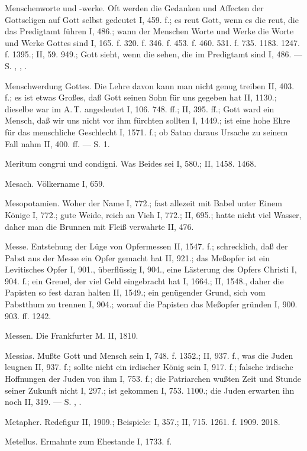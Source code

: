 Menschenworte und -werke. Oft werden die Gedanken und Affecten der Gottseligen auf Gott selbst gedeutet I, 459. f.; es reut Gott, wenn es die reut, die das Predigtamt führen I, 486.; wann der Menschen Worte und Werke die Worte und Werke Gottes sind I, 165. f. 320. f. 346. f. 453. f. 460. 531. f. 735. 1183. 1247. f. 1395.; II, 59. 949.; Gott sieht, wenn die sehen, die im Predigtamt sind I, 486. — S. , , .

Menschwerdung Gottes. Die Lehre davon kann man nicht genug treiben II, 403. f.; es ist etwas Großes, daß Gott seinen Sohn für uns gegeben hat II, 1130.; dieselbe war im A.\,T. angedeutet I, 106. 748. ff.; II, 395. ff.; Gott ward ein Mensch, daß wir uns nicht vor ihm fürchten sollten I, 1449.; ist eine hohe Ehre für das menschliche Geschlecht I, 1571. f.; ob Satan daraus Ursache zu seinem Fall nahm II, 400. ff. — S.  1.

Meritum congrui und condigni. Was Beides sei I, 580.; II, 1458. 1468.

Mesach. Völkername I, 659.

Mesopotamien. Woher der Name I, 772.; fast allezeit mit Babel unter Einem Könige I, 772.; gute Weide, reich an Vieh I, 772.; II, 695.; hatte nicht viel Wasser, daher man die Brunnen mit Fleiß verwahrte II, 476.

Messe. Entstehung der Lüge von Opfermessen II, 1547. f.; schrecklich, daß der Pabst aus der Messe ein Opfer gemacht hat II, 921.; das Meßopfer ist ein Levitisches Opfer I, 901., überflüssig I, 904., eine Lästerung des Opfers Christi I, 904. f.; ein Greuel, der viel Geld eingebracht hat I, 1664.; II, 1548., daher die Papisten so fest daran halten II, 1549.; ein genügender Grund, sich vom Pabstthum zu trennen I, 904.; worauf die Papisten das Meßopfer gründen I, 900. 903. ff. 1242.

Messen. Die Frankfurter M. II, 1810.

Messias. Mußte Gott und Mensch sein I, 748. f. 1352.; II, 937. f., was die Juden leugnen II, 937. f.; sollte nicht ein irdischer König sein I, 917. f.; falsche irdische Hoffnungen der Juden von ihm I, 753. f.; die Patriarchen wußten Zeit und Stunde seiner Zukunft nicht I, 297.; ist gekommen I, 753. 1100.; die Juden erwarten ihn noch II, 319. — S. , .

Metapher. Redefigur II, 1909.; Beispiele: I, 357.; II, 715. 1261. f. 1909. 2018.

Metellus. Ermahnte zum Ehestande I, 1733. f.

